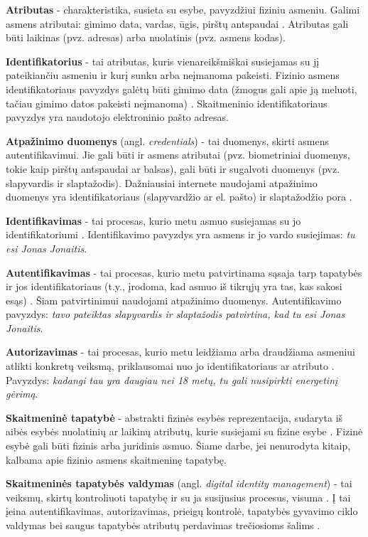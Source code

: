 \textbf{Atributas} - charakteristika, susieta su esybe, pavyzdžiui fiziniu asmeniu. Galimi asmens atributai: gimimo data,
vardas, ūgis, pirštų antspaudai \cite{Camp2004}. Atributas gali būti laikinas (pvz. adresas) arba nuolatinis (pvz. asmens kodas).

\textbf{Identifikatorius} - tai atributas, kuris vienareikšmiškai susiejamas su jį pateikiančiu asmeniu ir kurį
sunku arba neįmanoma pakeisti. Fizinio asmens identifikatoriaus pavyzdys galėtų būti gimimo data
(žmogus gali apie ją meluoti, tačiau gimimo datos pakeisti neįmanoma) \cite{Camp2004}. Skaitmeninio identifikatoriaus
pavyzdys yra naudotojo elektroninio pašto adresas.

\textbf{Atpažinimo duomenys} (angl. \textit{credentials}) - tai duomenys, skirti asmens autentifikavimui. Jie gali būti ir asmens atributai
(pvz. biometriniai duomenys, tokie kaip pirštų antspaudai ar balsas), gali būti ir sugalvoti duomenys (pvz. slapyvardis ir slaptažodis). Dažniausiai internete naudojami
atpažinimo duomenys yra identifikatoriaus (slapyvardžio ar el. pašto) ir slaptažodžio pora \cite{Maler2008}.

\textbf{Identifikavimas} - tai procesas, kurio metu asmuo susiejamas su jo identifikatoriumi \cite{Camp2004}. Identifikavimo
pavyzdys yra asmens ir jo vardo susiejimas: \textit{tu esi Jonas Jonaitis}.

\textbf{Autentifikavimas} - tai procesas, kurio metu patvirtinama sąsaja tarp tapatybės ir jos identifikatoriaus (t.y., įrodoma,
kad asmuo iš tikrųjų yra tas, kas sakosi esąs) \cite{Camp2004, Strictest2011}. Šiam patvirtinimui naudojami atpažinimo duomenys. Autentifikavimo pavyzdys:
\textit{tavo pateiktas slapyvardis ir slaptažodis patvirtina, kad tu esi Jonas Jonaitis}.

\textbf{Autorizavimas} - tai procesas, kurio metu leidžiama arba draudžiama asmeniui atlikti konkretų veiksmą, priklausomai
nuo jo identifikatoriaus ar atributo \cite{Camp2004}. Pavyzdys: \textit{kadangi tau yra daugiau nei 18 metų, tu gali nusipirkti
energetinį gėrimą}. 

\textbf{Skaitmeninė tapatybė} - abstrakti fizinės esybės reprezentacija, sudaryta iš aibės esybės nuolatinių ar laikinų atributų,
kurie susiejami su fizine esybe \cite{Glasser2009, Camp2004}. Fizinė esybė gali būti fizinis arba juridinis asmuo.
Šiame darbe, jei nenurodyta kitaip, kalbama apie fizinio asmens skaitmeninę tapatybę.

\textbf{Skaitmeninės tapatybės valdymas} (angl. \textit{digital identity management}) - tai veiksmų, skirtų kontroliuoti
tapatybę ir su ja susijusius procesus, visuma \cite{Dabrowski2008}. Į tai įeina autentifikavimas, autorizavimas,
prieigų kontrolė, tapatybės gyvavimo ciklo
valdymas bei saugus tapatybės atributų perdavimas trečiosioms šalims \cite{Cao2010}.

